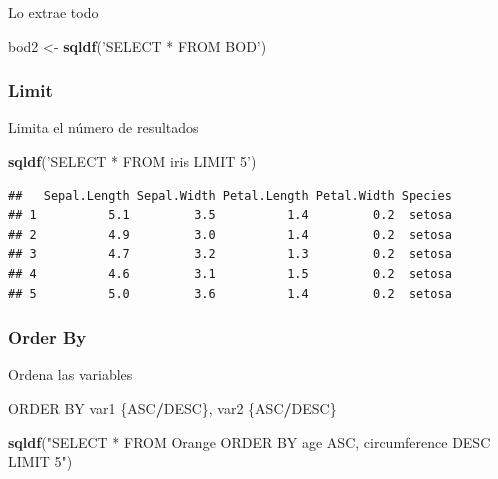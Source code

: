 \documentclass[]{book}
\newenvironment{Shaded}{\begin{snugshade}}{\end{snugshade}}
\newcommand{\KeywordTok}[1]{\textcolor[rgb]{0.13,0.29,0.53}{\textbf{#1}}}
\newcommand{\NormalTok}[1]{#1}
\newcommand{\OperatorTok}[1]{\textcolor[rgb]{0.81,0.36,0.00}{\textbf{#1}}}
\newcommand{\StringTok}[1]{\textcolor[rgb]{0.31,0.60,0.02}{#1}}
\begin{document}
Lo extrae todo

\begin{Shaded}
\begin{Highlighting}[]
\NormalTok{bod2 <-}\StringTok{ }\KeywordTok{sqldf}\NormalTok{(}\StringTok{'SELECT * FROM BOD'}\NormalTok{)}
\end{Highlighting}
\end{Shaded}

\hypertarget{limit}{%
\subsubsection{Limit}\label{limit}}

Limita el número de resultados

\begin{Shaded}
\begin{Highlighting}[]
\KeywordTok{sqldf}\NormalTok{(}\StringTok{'SELECT * FROM iris LIMIT 5'}\NormalTok{)}
\end{Highlighting}
\end{Shaded}

\begin{verbatim}
##   Sepal.Length Sepal.Width Petal.Length Petal.Width Species
## 1          5.1         3.5          1.4         0.2  setosa
## 2          4.9         3.0          1.4         0.2  setosa
## 3          4.7         3.2          1.3         0.2  setosa
## 4          4.6         3.1          1.5         0.2  setosa
## 5          5.0         3.6          1.4         0.2  setosa
\end{verbatim}

\hypertarget{order-by}{%
\subsubsection{Order By}\label{order-by}}

Ordena las variables

\begin{Shaded}
\begin{Highlighting}[]
\NormalTok{ORDER BY var1 \{ASC}\OperatorTok{/}\NormalTok{DESC\}, var2 \{ASC}\OperatorTok{/}\NormalTok{DESC\}}
\end{Highlighting}
\end{Shaded}

\begin{Shaded}
\begin{Highlighting}[]
\KeywordTok{sqldf}\NormalTok{(}\StringTok{"SELECT * FROM Orange ORDER BY age ASC, circumference DESC LIMIT 5"}\NormalTok{)}
\end{Highlighting}
\end{Shaded}
\end{document}
